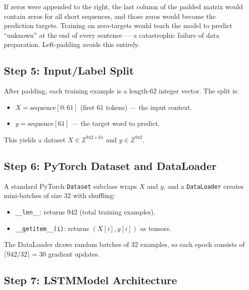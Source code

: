 \documentclass[12pt,a4paper]{article}
\begin{document}
\begin{warningbox}[title=Why Left-Pad, Not Right-Pad]
  If zeros were appended to the right, the last column of the padded matrix
  would contain zeros for all short sequences, and those zeros would become
  the prediction targets.  Training on zero-targets would teach the model to
  predict ``unknown'' at the end of every sentence --- a catastrophic failure
  of data preparation.  Left-padding avoids this entirely.
\end{warningbox}

\subsection{Step 5: Input/Label Split}
\label{subsec:xy-split}

After padding, each training example is a length-62 integer vector.  The
split is:

\begin{itemize}
  \item $X = \text{sequence}[0:61]$ (first 61 tokens) --- the input context.
  \item $y = \text{sequence}[61]$ --- the target word to predict.
\end{itemize}

This yields a dataset $X \in \mathbb{Z}^{942 \times 61}$ and
$y \in \mathbb{Z}^{942}$.

\subsection{Step 6: PyTorch Dataset and DataLoader}
\label{subsec:dataset}

A standard PyTorch \texttt{Dataset} subclass wraps $X$ and $y$, and a
\texttt{DataLoader} creates mini-batches of size 32 with shuffling:

\begin{itemize}
  \item \texttt{\_\_len\_\_}: returns 942 (total training examples).
  \item \texttt{\_\_getitem\_\_(i)}: returns $(X[i], y[i])$ as tensors.
\end{itemize}

The DataLoader draws random batches of 32 examples, so each epoch consists
of $\lceil 942 / 32 \rceil = 30$ gradient updates.

\subsection{Step 7: LSTMModel Architecture}
\label{subsec:model}
\end{document}
